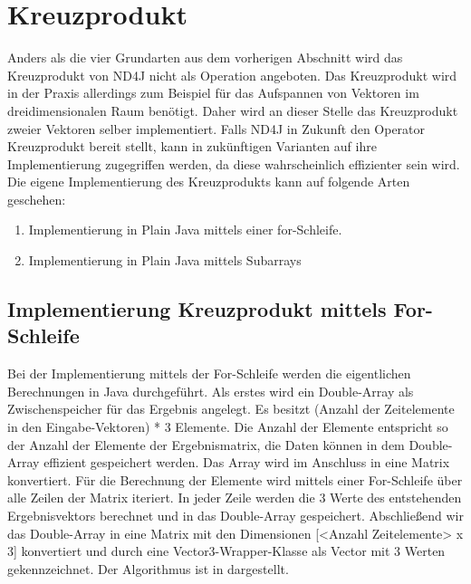 \section{Kreuzprodukt}
Anders als die vier Grundarten aus dem vorherigen Abschnitt wird das Kreuzprodukt von ND4J nicht als Operation angeboten.
Das Kreuzprodukt wird in der Praxis allerdings zum Beispiel für das Aufspannen von Vektoren im dreidimensionalen Raum benötigt.
Daher wird an dieser Stelle das Kreuzprodukt zweier Vektoren selber implementiert.
Falls ND4J in Zukunft den Operator Kreuzprodukt bereit stellt, kann in zukünftigen Varianten auf ihre Implementierung zugegriffen werden, da diese wahrscheinlich effizienter sein wird.
Die eigene Implementierung des Kreuzprodukts kann auf folgende Arten geschehen:
\begin{enumerate}
	\item Implementierung in Plain Java mittels einer for-Schleife.
	\item Implementierung in Plain Java mittels Subarrays
\end{enumerate}

\subsection{Implementierung Kreuzprodukt mittels For-Schleife}
Bei der Implementierung mittels der For-Schleife werden die eigentlichen Berechnungen in Java durchgeführt.
Als erstes wird ein Double-Array als Zwischenspeicher für das Ergebnis angelegt.
Es besitzt (Anzahl der Zeitelemente in den Eingabe-Vektoren) * 3 Elemente.
Die Anzahl der Elemente entspricht so der Anzahl der Elemente der Ergebnismatrix, die Daten können in dem Double-Array effizient gespeichert werden.
Das Array wird im Anschluss in eine Matrix konvertiert.
Für die Berechnung der Elemente wird mittels einer For-Schleife über alle Zeilen der Matrix iteriert.
In jeder Zeile werden die 3 Werte des entstehenden Ergebnisvektors berechnet und in das Double-Array gespeichert.
Abschließend wir das Double-Array in eine Matrix mit den Dimensionen [<Anzahl Zeitelemente> x 3] konvertiert und durch eine Vector3-Wrapper-Klasse als Vector mit 3 Werten gekennzeichnet.
Der Algorithmus ist in  dargestellt.

